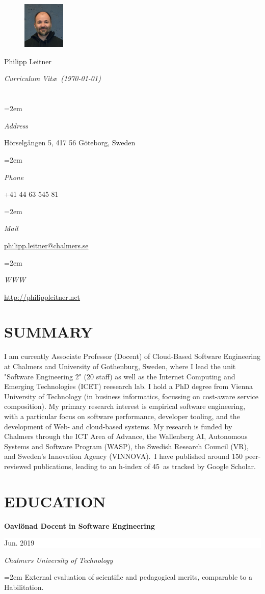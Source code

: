 \documentclass[paper=letter,fontsize=11pt]{scrartcl} %
\newlength{\spacebox}
\newcommand{\sepspace}{\vspace*{1em}}		%
\newcommand{\MyName}[1]{ %
		\Huge \usefont{OT1}{phv}{b}{n} \hfill #1
		\par \normalsize \normalfont}
\newcommand{\MySlogan}[1]{ %
		\large \usefont{OT1}{phv}{m}{n}\hfill \textit{#1}
		\par \normalsize \normalfont}
\newcommand{\NewPart}[2]{\section*{\uppercase{#1} #2}}
\newcommand{\PersonalEntry}[2]{
		\noindent\hangindent=2em\hangafter=0 %
		\parbox{\spacebox}{        %
		\textit{#1}}		       %
		\hspace{1.5em} #2 \par}    %
\newcommand{\EducationEntry}[4]{
		\noindent \textbf{#1} \hfill      %
		\colorbox{White}{%
			\parbox{10em}{%
			\hfill\color{Black}#2}} \par  %
		\noindent \textit{#3} \par        %
		\noindent\hangindent=2em\hangafter=0 \small #4 %
		\normalsize \par}
\begin{document}

\begin{figure}
	\vspace*{-2em}
		\includegraphics[width=0.18\textwidth]{wasp_profile.jpg}
\end{figure}

\MyName{Philipp Leitner}
\MySlogan{Curriculum Vit\ae\ (\today)}

\sepspace

\NewPart{}{}

\PersonalEntry{Address}{Hörselgången 5,
  417 56 Göteborg, Sweden}
\PersonalEntry{Phone}{+41 44 63 545 81}
\PersonalEntry{Mail}{\href{mailto:philipp.leitner@chalmers.se}{philipp.leitner@chalmers.se}}
\PersonalEntry{WWW}{\href{http://philippleitner.net}{http://philippleitner.net}}

\NewPart{Summary}{}
I am currently Associate Professor (Docent) of Cloud-Based Software Engineering at Chalmers and University of Gothenburg, Sweden, where I lead the unit "Software Engineering 2" (20 staff) as well as the Internet Computing and Emerging Technologies (ICET) reesearch lab. I hold a PhD degree from Vienna University of Technology (in business informatics, focussing on cost-aware service composition). My primary research interest is empirical software engineering, with a particular focus on software performance, developer tooling, and the development of Web- and cloud-based systems. My research is funded by Chalmers through the ICT Area of Advance, the Wallenberg AI, Autonomous Systems and Software Program (WASP), the Swedish Research Council (VR), and Sweden's Innovation Agency (VINNOVA). I have published around 150 peer-reviewed publications, leading to an h-index of 45 as tracked by Google Scholar.


\NewPart{Education}{}

\EducationEntry{Oavlönad Docent in Software Engineering}{Jun. 2019}{Chalmers University of Technology}{
External evaluation of scientific and pedagogical merits, comparable to a Habilitation.}
\sepspace
\end{document}
